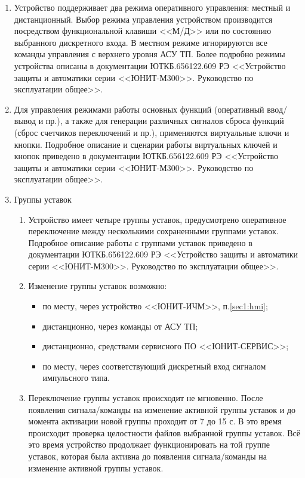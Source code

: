 \begin{enumerate}
\begin{longtable}
\end{longtable}
\setlength{\extrarowheight}{0.0cm} %
\normalsize

\item
Устройство поддерживает два режима оперативного управления: местный и дистанционный. Выбор режима управления устройством производится посредством функциональной клавиши <<М/Д>> или по состоянию выбранного дискретного входа. В местном режиме игнорируются все команды управления с верхнего уровня АСУ ТП. Более подробно режимы устройства описаны в документации ЮТКБ.656122.609 РЭ <<Устройство защиты и автоматики серии <<ЮНИТ-М300>>. Руководство по эксплуатации общее>>.
\item
Для управления режимами работы основных функций (оперативный ввод/вывод и пр.), а также для генерации различных сигналов сброса функций (сброс счетчиков переключений и пр.), применяются виртуальные ключи и кнопки. Подробное описание и сценарии работы виртуальных ключей и кнопок приведено в документации ЮТКБ.656122.609 РЭ <<Устройство защиты и автоматики серии <<ЮНИТ-М300>>. Руководство по эксплуатации общее>>.


\item Группы уставок
\begin{enumerate}

\item Устройство имеет четыре группы уставок, предусмотрено оперативное переключение между несколькими сохраненными группами уставок. Подробное описание работы с группами уставок приведено в документации ЮТКБ.656122.609 РЭ <<Устройство защиты и автоматики серии <<ЮНИТ-М300>>. Руководство по эксплуатации общее>>.

\item
Изменение группы уставок возможно:
\begin{itemize}
    \item по месту, через устройство <<ЮНИТ-ИЧМ>>, п.\ref{sec1:hmi};
    \item дистанционно, через команды от АСУ ТП;
    \item дистанционно, средствами сервисного ПО <<ЮНИТ-СЕРВИС>>;
    \item по месту, через соответствующий дискретный вход сигналом импульсного типа.
\end{itemize}
\item
Переключение группы уставок происходит не мгновенно. После появления сигнала/команды на изменение активной группы уставок и до момента активации новой группы проходит от 7 до 15 с. В это
время происходит проверка целостности файлов выбранной группы уставок. Всё это время устройство продолжает функционировать на той группе уставок, которая была активна до появления сигнала/команды на изменение активной группы уставок.


\end{enumerate}
\end{enumerate}
